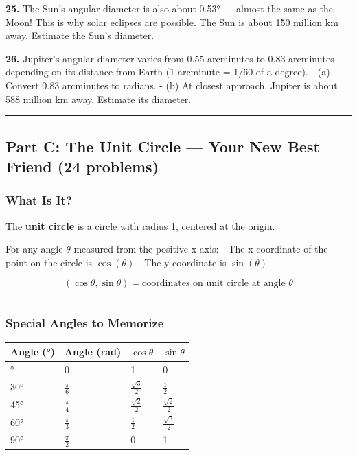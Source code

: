 \documentclass[
  11pt,
]{article}
\begin{document}
\textbf{25.} The Sun's angular diameter is also about 0.53° --- almost
the same as the Moon! This is why solar eclipses are possible. The Sun
is about 150 million km away. Estimate the Sun's diameter.

\textbf{26.} Jupiter's angular diameter varies from 0.55 arcminutes to
0.83 arcminutes depending on its distance from Earth (1 arcminute = 1/60
of a degree). - (a) Convert 0.83 arcminutes to radians. - (b) At closest
approach, Jupiter is about 588 million km away. Estimate its diameter.

\begin{center}\rule{0.5\linewidth}{0.5pt}\end{center}

\hypertarget{part-c-the-unit-circle-your-new-best-friend-24-problems}{%
\subsection{Part C: The Unit Circle --- Your New Best Friend (24
problems)}\label{part-c-the-unit-circle-your-new-best-friend-24-problems}}

\hypertarget{what-is-it}{%
\subsubsection{What Is It?}\label{what-is-it}}

The \textbf{unit circle} is a circle with radius 1, centered at the
origin.

For any angle \(\theta\) measured from the positive x-axis: - The
x-coordinate of the point on the circle is \(\cos(\theta)\) - The
y-coordinate is \(\sin(\theta)\)

\[\boxed{(\cos\theta, \sin\theta) = \text{coordinates on unit circle at angle } \theta}\]

\begin{center}\rule{0.5\linewidth}{0.5pt}\end{center}

\hypertarget{special-angles-to-memorize}{%
\subsubsection{Special Angles to
Memorize}\label{special-angles-to-memorize}}

\begin{longtable}[]{@{}llll@{}}
\toprule\noalign{}
Angle (°) & Angle (rad) & \(\cos\theta\) & \(\sin\theta\) \\
\midrule\noalign{}
\endhead
\bottomrule\noalign{}
\endlastfoot
0° & 0 & 1 & 0 \\
30° & \(\frac{\pi}{6}\) & \(\frac{\sqrt{3}}{2}\) & \(\frac{1}{2}\) \\
45° & \(\frac{\pi}{4}\) & \(\frac{\sqrt{2}}{2}\) &
\(\frac{\sqrt{2}}{2}\) \\
60° & \(\frac{\pi}{3}\) & \(\frac{1}{2}\) & \(\frac{\sqrt{3}}{2}\) \\
90° & \(\frac{\pi}{2}\) & 0 & 1 \\
\end{longtable}
\end{document}
